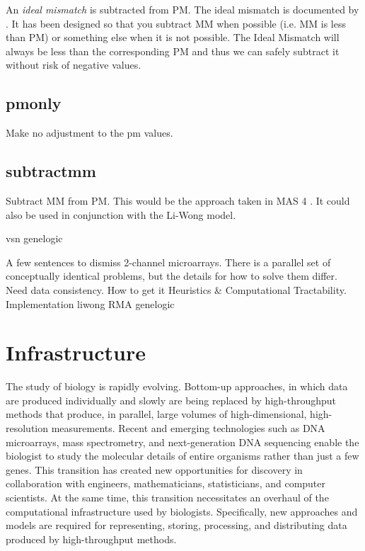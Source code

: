 {An \emph{ideal mismatch} is subtracted from PM. The ideal mismatch is documented by \cite{affy:tech:2002}. It has been designed so that you subtract MM when possible (i.e. MM is less than PM) or something else when it is not possible. The Ideal Mismatch will always be less than the corresponding PM and thus we can safely subtract it without risk of negative values.

\subsection{pmonly}

Make no adjustment to the pm values.

\subsection{subtractmm}

Subtract MM from PM. This would be the approach taken in MAS 4 \cite{affy4}. It could also be used in conjunction with the Li-Wong model.

vsn			\cite{PMID_12169536}
genelogic		\cite{PMID_17059591}

A few sentences to dismiss 2-channel microarrays.  There is a parallel set of conceptually identical problems, but the details for how to solve them differ.
Need data consistency.  How to get it
Heuristics \& Computational Tractability.  Implementation
liwong			\cite{PMID_11134512,PMID_11532216}
RMA			\cite{PMID_12582260,PMID_12925520}
genelogic		\cite{PMID_17059591}

\section{Infrastructure}
\label{Infrastructure}

The study of biology is rapidly evolving.  Bottom-up approaches, in which data
are produced individually and slowly are being replaced by high-throughput
methods that produce, in parallel, large volumes of high-dimensional,
high-resolution measurements.  Recent and emerging technologies such as DNA
microarrays, mass spectrometry, and next-generation DNA sequencing enable the
biologist to study the molecular details of entire organisms rather than just a
few genes.  This transition has created new opportunities for discovery in
collaboration with engineers, mathematicians, statisticians, and computer
scientists.  At the same time, this transition necessitates an overhaul of the
computational infrastructure used by biologists.  Specifically, new approaches and
models are required for representing, storing, processing, and distributing
data produced by high-throughput methods.

}
